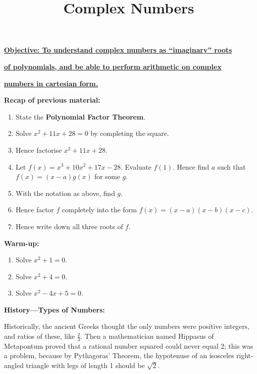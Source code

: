 \documentclass{article}
\begin{document}
\title{Complex Numbers}
\date{}

\maketitle

\Large

\textbf{ \underline{Objective: To understand complex numbers as ``imaginary'' roots}}

\textbf{\underline{of polynomials, and be able to perform arithmetic on complex}}

\textbf{\underline{numbers in cartesian form.}}

\vspace{5mm}


{\bf Recap of previous material:}

\vspace{5mm}

\begin{enumerate}
\item State the \textbf{Polynomial Factor Theorem}.
\item Solve $x^2+11x+28=0$ by completing the square.
\item Hence factorise $x^2+11x+28$.
\item Let $f(x)=x^3+10x^2+17x-28$. Evaluate $f(1)$. Hence find $a$ such that $f(x)=(x-a)g(x)$ for some $g$.
\item With the notation as above, find $g$.
\item Hence factor $f$ completely into the form $f(x)=(x-a)(x-b)(x-c)$.
\item Hence write down all three roots of $f$.
\end{enumerate}


\clearpage

{\bf Warm-up:}

\vspace{5mm}

\begin{enumerate}
\item Solve $x^2+1=0$.
\item Solve $x^2+4=0$.
\item Solve $x^2-4x+5=0$.
\end{enumerate}

\clearpage


\textbf{History---Types of Numbers:}

Historically, the ancient Greeks thought the only numbers were positive integers, and ratios of these, like $\frac{2}{3}$. Then a mathematician named Hippasus of Metapontum proved that a rational number squared could never equal 2; this was a problem, because by Pythagoras' Theorem, the hypotenuse of an isosceles right-angled triangle with legs of length 1 should be $\sqrt{2}$.
\end{document}
